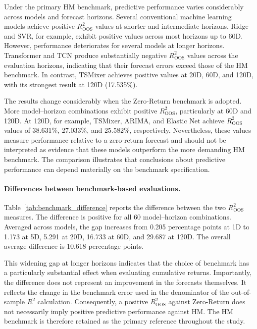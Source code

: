 \documentclass[12pt,twoside]{ord}
\begin{document}
Under the primary HM benchmark, predictive performance varies considerably across models and forecast horizons. Several conventional machine learning models achieve positive \(R^2_{\mathrm{OOS}}\) values at shorter and intermediate horizons. Ridge and SVR, for example, exhibit positive values across most horizons up to 60D. However, performance deteriorates for several models at longer horizons. Transformer and TCN produce substantially negative \(R^2_{\mathrm{OOS}}\) values across the evaluation horizons, indicating that their forecast errors exceed those of the HM benchmark. In contrast, TSMixer achieves positive values at 20D, 60D, and 120D, with its strongest result at 120D (17.535\%).

The results change considerably when the Zero-Return benchmark is adopted. More model--horizon combinations exhibit positive \(R^2_{\mathrm{OOS}}\), particularly at 60D and 120D. At 120D, for example, TSMixer, ARIMA, and Elastic Net achieve \(R^2_{\mathrm{OOS}}\) values of 38.631\%, 27.033\%, and 25.582\%, respectively. Nevertheless, these values measure performance relative to a zero-return forecast and should not be interpreted as evidence that these models outperform the more demanding HM benchmark. The comparison illustrates that conclusions about predictive performance can depend materially on the benchmark specification.

\paragraph{Differences between benchmark-based evaluations.} Table~\ref{tab:benchmark_difference} reports the difference between the two \(R^2_{\mathrm{OOS}}\) measures. The difference is positive for all 60 model--horizon combinations. Averaged across models, the gap increases from 0.205 percentage points at 1D to 1.173 at 5D, 5.291 at 20D, 16.733 at 60D, and 29.687 at 120D. The overall average difference is 10.618 percentage points.

This widening gap at longer horizons indicates that the choice of benchmark has a particularly substantial effect when evaluating cumulative returns. Importantly, the difference does not represent an improvement in the forecasts themselves. It reflects the change in the benchmark error used in the denominator of the out-of-sample \(R^2\) calculation. Consequently, a positive \(R^2_{\mathrm{OOS}}\) against Zero-Return does not necessarily imply positive predictive performance against HM. The HM benchmark is therefore retained as the primary reference throughout the study.
\end{document}
